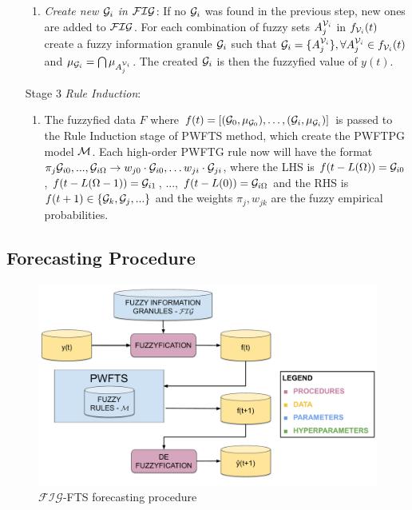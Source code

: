 \begin{enumerate}
\begin{enumerate}
    \item \textit{Create new $\mathcal{G}_i$ in $\mathcal{FIG}$}: If no $\mathcal{G}_i$ was found in the previous step, new ones are added to $\mathcal{FIG}$. For each combination of fuzzy sets $A_j^{\mathcal{V}_i}$ in $f_{\mathcal{V}_i}(t)$ create a fuzzy information granule $\mathcal{G}_i$ such that $\mathcal{G}_i = \{ A_j^{\mathcal{V}_i} \}, \forall A_j^{\mathcal{V}_i} \in f_{\mathcal{V}_i}(t)$ and $\mu_{\mathcal{G}_i} = \bigcap \mu_{A_j^{\mathcal{V}_i}}$. The created $\mathcal{G}_i$ is then the fuzzyfied value of $y(t)$.
\end{enumerate}


\item[Stage 3] \textit{Rule Induction}: 
\begin{enumerate}
\item The fuzzyfied data $F$ where $f(t) = [(\mathcal{G}_0,\mu_{\mathcal{G}_0}),\ldots,(\mathcal{G}_i,\mu_{\mathcal{G}_i})]$ is passed to the Rule Induction stage of PWFTS method, which create the PWFTPG model $\mathcal{M}$. Each high-order PWFTG rule now will have the format $\pi_j \mathcal{G}_{i0},...,\mathcal{G}_{i\Omega} \rightarrow w_{j0} \cdot \mathcal{G}_{i0}, \ldots w_{ji} \cdot \mathcal{G}_{ji}$, where the LHS is $f(t - L(\Omega)) = \mathcal{G}_{i0}$, $f(t - L(\Omega-1)) = \mathcal{G}_{i1}$, ..., $f(t - L(0)) = \mathcal{G}_{i\Omega}$ and the RHS is $f(t+1) \in \{\mathcal{G}_k, \mathcal{G}_j,...\}$ and the weights $\pi_j, w_{jk}$ are the fuzzy empirical probabilities.
\end{enumerate}
\end{enumerate}


\subsection{Forecasting Procedure} 
\label{sec:fig_forecasting_procedure}

\begin{figure}
\centering
\includegraphics[width=\textwidth]{figures/figfts_forecasting_procedure.pdf}
\caption{$\mathcal{FIG}$-FTS forecasting procedure} 
\label{fig:figfts_forecasting_procedure}
\end{figure}

